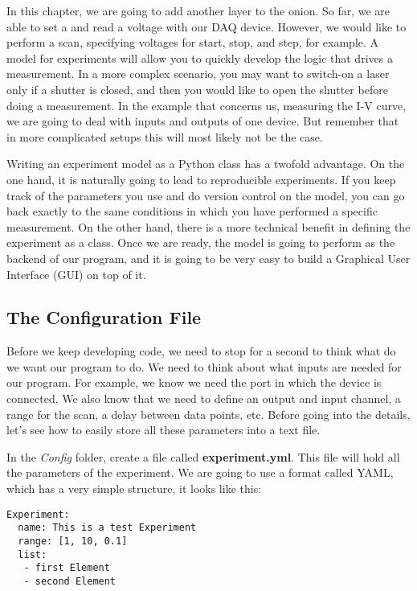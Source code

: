 In this chapter, we are going to add another layer to the onion. So far, we are able to set a and read a voltage with our DAQ device. However, we would like to perform a scan, specifying voltages for start, stop, and step, for example. A model for experiments will allow you to quickly develop the logic that drives a measurement. In a more complex scenario, you may want to switch-on a laser only if a shutter is closed, and then you would like to open the shutter before doing a measurement. In the example that concerns us, measuring the  I-V curve, we are going to deal with inputs and outputs of one device. But remember that in more complicated setups this will most likely not be the case.

Writing an experiment model as a Python class has a twofold advantage. On the one hand, it is naturally going to lead to reproducible experiments. If you keep track of the parameters you use and do version control on the model, you can go back exactly to the same conditions in which you have performed a specific measurement. On the other hand, there is a more technical benefit in defining the experiment as a class. Once we are ready, the model is going to perform as the backend of our program, and it is going to be very easy to build a Graphical User Interface ({GUI}) on top of it.



\subsection{The Configuration File}\label{subsection:configuration-file}
Before we keep developing code, we need to stop for a second to think what do we want our program to do. We need to think about what inputs are needed for our program. For example, we know we need the port in which the device is connected. We also know that we need to define an output and input channel, a range for the scan, a delay between data points, etc. Before going into the details, let's see how to easily store all these parameters into a text file. 

In the \emph{Config} folder, create a file called \textbf{experiment.yml}. This file will hold all the parameters of the experiment. We are going to use a format called {YAML}, which has a very simple structure, it looks like this:

\begin{verbatim}
Experiment:
  name: This is a test Experiment
  range: [1, 10, 0.1]
  list:
   - first Element
   - second Element
\end{verbatim}

